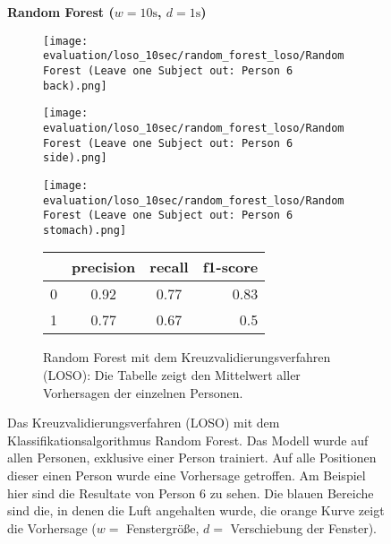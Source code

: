 \begin{figure}[H]
\begin{subfigure}{1\textwidth}
    \end{subfigure}
    \newline
    \vspace*{1 cm}
    \newline
    \textbf{Random Forest ($w=10\si{\s}$, $d=1\si{\s}$)}
    \begin{subfigure}{1\textwidth}
      \texttt{[image: evaluation/loso\_10sec/random\_forest\_loso/Random Forest (Leave one Subject out: Person 6 back).png]}
    \end{subfigure}
    \begin{subfigure}{1\textwidth}
      \texttt{[image: evaluation/loso\_10sec/random\_forest\_loso/Random Forest (Leave one Subject out: Person 6 side).png]}
    \end{subfigure}
    \begin{subfigure}{1\textwidth}
      \texttt{[image: evaluation/loso\_10sec/random\_forest\_loso/Random Forest (Leave one Subject out: Person 6 stomach).png]}
  \end{subfigure}

  \begin{subfigure}{1\textwidth}
      \begin{center}
          \begin{tabular}{ | l | c | c | r | }
            \hline
             & precision & recall & f1-score\\ \hline
            0 & 0.92 & 0.77 & 0.83\\ \hline
            1 & 0.77 & 0.67 & 0.5\\
            \hline
          \end{tabular}
      \end{center}
      \caption{Random Forest mit dem Kreuzvalidierungsverfahren (LOSO): Die Tabelle zeigt den Mittelwert aller Vorhersagen der einzelnen Personen.}
      \label{implementation:app:screenshots:user_studies_information}
  \end{subfigure}
    \caption{Das Kreuzvalidierungsverfahren (LOSO) mit dem Klassifikationsalgorithmus Random Forest. Das Modell wurde auf allen Personen, exklusive einer Person trainiert. Auf alle Positionen dieser einen Person wurde eine Vorhersage getroffen. Am Beispiel hier sind die Resultate von Person 6 zu sehen. Die blauen Bereiche sind die, in denen die Luft angehalten wurde, die orange Kurve zeigt die Vorhersage ($w=$ Fenstergröße, $d=$ Verschiebung der Fenster).}
\label{evaluation:random_forest_loso:person6}
\end{figure}

